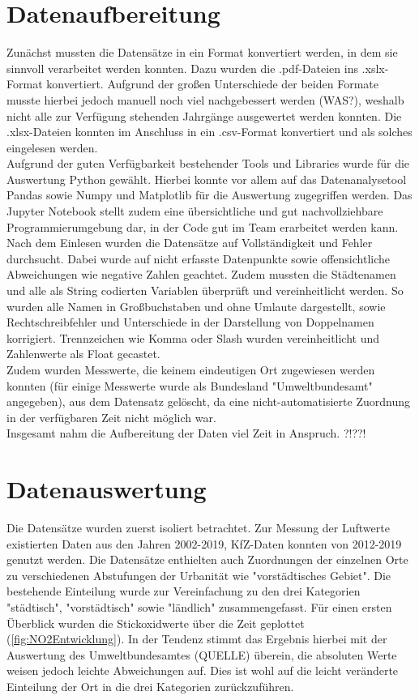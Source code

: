 \documentclass[11pt,a4paper,oneside,german]{article}
\begin{document}
\section{Datenaufbereitung}

Zunächst mussten die Datensätze in ein Format konvertiert werden, in dem sie sinnvoll verarbeitet werden konnten. Dazu wurden die .pdf-Dateien ins .xslx-Format konvertiert. Aufgrund der großen Unterschiede der beiden Formate musste hierbei jedoch manuell noch viel nachgebessert werden (WAS?), weshalb nicht alle zur Verfügung stehenden Jahrgänge ausgewertet werden konnten. Die .xlsx-Dateien konnten im Anschluss in ein .csv-Format konvertiert und als solches eingelesen werden.\\
Aufgrund der guten Verfügbarkeit bestehender Tools und Libraries wurde für die Auswertung Python gewählt. Hierbei konnte vor allem auf das Datenanalysetool Pandas sowie Numpy und Matplotlib für die Auswertung zugegriffen werden. Das Jupyter Notebook stellt zudem eine übersichtliche und gut nachvollziehbare Programmierumgebung dar, in der Code gut im Team erarbeitet werden kann.\\
Nach dem Einlesen wurden die Datensätze auf Vollständigkeit und Fehler durchsucht. Dabei wurde auf nicht erfasste Datenpunkte sowie offensichtliche Abweichungen wie negative Zahlen geachtet. Zudem mussten die Städtenamen und alle als String codierten Variablen überprüft und vereinheitlicht werden. So wurden alle Namen in Großbuchstaben und ohne Umlaute dargestellt, sowie Rechtschreibfehler und Unterschiede in der Darstellung von Doppelnamen korrigiert. Trennzeichen wie Komma oder Slash wurden vereinheitlicht und Zahlenwerte als Float gecastet. \\
Zudem wurden Messwerte, die keinem eindeutigen Ort zugewiesen werden konnten (für einige Messwerte wurde als Bundesland "Umweltbundesamt" angegeben), aus dem Datensatz gelöscht, da eine nicht-automatisierte Zuordnung in der verfügbaren Zeit nicht möglich war. \\
Insgesamt nahm die Aufbereitung der Daten viel Zeit in Anspruch. ?!??!

\section{Datenauswertung}

Die Datensätze wurden zuerst isoliert betrachtet. Zur Messung der Luftwerte existierten Daten aus den Jahren 2002-2019, KfZ-Daten konnten von 2012-2019 genutzt werden. Die  Datensätze enthielten auch Zuordnungen der einzelnen Orte zu verschiedenen Abstufungen der Urbanität wie "vorstädtisches Gebiet". Die bestehende Einteilung wurde zur Vereinfachung zu den drei Kategorien "städtisch", "vorstädtisch" sowie "ländlich" zusammengefasst. Für einen ersten Überblick wurden die Stickoxidwerte über die Zeit geplottet (\ref{fig:NO2Entwicklung}). In der Tendenz stimmt das Ergebnis hierbei mit der Auswertung des Umweltbundesamtes (QUELLE) überein, die absoluten Werte weisen jedoch leichte Abweichungen auf. Dies ist wohl auf die leicht veränderte Einteilung der Ort in die drei Kategorien zurückzuführen.\\
\end{document}
